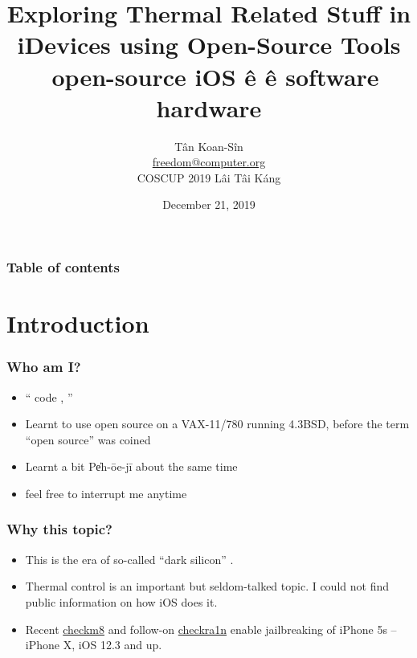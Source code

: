 \documentclass{beamer}
\begin{document}
\title{Exploring Thermal Related Stuff in iDevices using Open-Source Tools \\
  \ open-source     iOS ê      \^e software  hardware}

\author[freedom]{T\^an Koan-S\^in \\ \href{mailto:freedom@computer.org}{freedom@computer.org} \\ COSCUP 2019 Lâi Tâi Káng}
\date{December 21, 2019}

\begin{frame}
  \titlepage
\end{frame}

\begin{frame}
  \frametitle{Table of contents}
  \tableofcontents
\end{frame}

\section{Introduction}
\begin{frame}
  \frametitle{Who am I?}
  \begin{itemize}
    \item ``    code  ,    '' 
    \item Learnt to use open source on a VAX-11/780 running 4.3BSD, before the term ``open source'' was coined
    \item Learnt a bit Pe̍h-ōe-jī about the same time
    \item feel free to interrupt me anytime
  \end{itemize}
\end{frame}

\begin{frame}
  \frametitle{Why this topic?}
  \begin{itemize}
  \item This is the era of so-called ``dark silicon'' \cite{Esmaeilzadeh:2011:DSE:2000064.2000108}.
  \item Thermal control is an important but seldom-talked topic. I could not find public information on how iOS does it.
  \item Recent \href{https://github.com/axi0mX/ipwndfu}{checkm8} \cite{checkm8} and follow-on \href{https://checkra.in/}{checkra1n} \cite{checkra1n} enable jailbreaking of iPhone 5s – iPhone X, iOS 12.3 and up.
  \end{itemize}
\end{frame}
\end{document}
